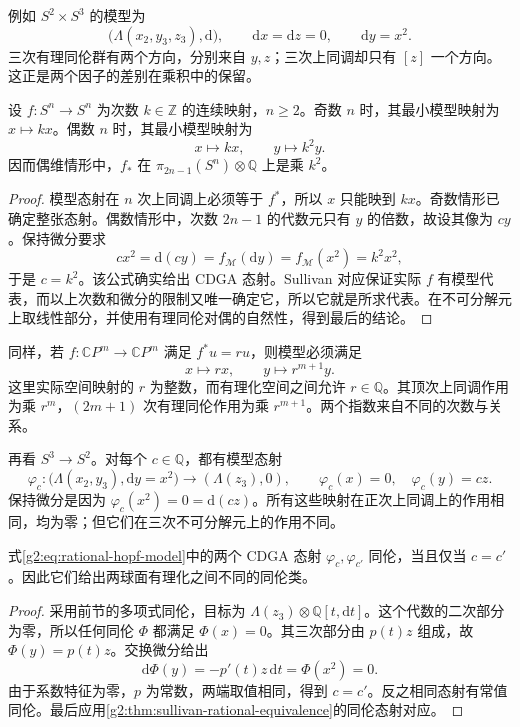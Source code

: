 例如 \(S^2\times S^3\) 的模型为
\[
	\bigl(\Lambda(x_2,y_3,z_3),\mathrm d\bigr),\qquad
	\mathrm dx=\mathrm dz=0,\qquad \mathrm dy=x^2.
\]
三次有理同伦群有两个方向，分别来自 \(y,z\)；三次上同调却只有 \([z]\) 一个方向。这正是两个因子的差别在乘积中的保留。

\begin{proposition}\label{g2:prop:degree-map-minimal-model}
	设 \(f:S^n\to S^n\) 为次数 \(k\in\mathbb Z\) 的连续映射，\(n\geq2\)。奇数 \(n\) 时，其最小模型映射为 \(x\mapsto kx\)。偶数 \(n\) 时，其最小模型映射为
	\[
		x\longmapsto kx,\qquad y\longmapsto k^2y.
	\]
	因而偶维情形中，\(f_*\) 在 \(\pi_{2n-1}(S^n)\otimes\mathbb Q\) 上是乘 \(k^2\)。
\end{proposition}
\begin{proof}
	模型态射在 \(n\) 次上同调上必须等于 \(f^*\)，所以 \(x\) 只能映到 \(kx\)。奇数情形已确定整张态射。偶数情形中，次数 \(2n-1\) 的代数元只有 \(y\) 的倍数，故设其像为 \(cy\)。保持微分要求
	\[
		c x^2=\mathrm d(cy)=f_{\mathcal M}(\mathrm dy)
		=f_{\mathcal M}(x^2)=k^2x^2,
	\]
	于是 \(c=k^2\)。该公式确实给出 CDGA 态射。Sullivan 对应保证实际 \(f\) 有模型代表，而以上次数和微分的限制又唯一确定它，所以它就是所求代表。在不可分解元上取线性部分，并使用有理同伦对偶的自然性，得到最后的结论。
\end{proof}

同样，若 \(f:\mathbb CP^m\to\mathbb CP^m\) 满足 \(f^*u=ru\)，则模型必须满足
\[
	x\longmapsto rx,\qquad y\longmapsto r^{m+1}y.
\]
这里实际空间映射的 \(r\) 为整数，而有理化空间之间允许 \(r\in\mathbb Q\)。其顶次上同调作用为乘 \(r^m\)，\((2m+1)\) 次有理同伦作用为乘 \(r^{m+1}\)。两个指数来自不同的次数与关系。

\ProseParagraphBreak

再看 \(S^3\to S^2\)。对每个 \(c\in\mathbb Q\)，都有模型态射
\begin{equation}\label{g2:eq:rational-hopf-model}
	\varphi_c:\bigl(\Lambda(x_2,y_3),\mathrm dy=x^2\bigr)\longrightarrow(\Lambda(z_3),0),
	\qquad \varphi_c(x)=0,\quad\varphi_c(y)=cz.
\end{equation}
保持微分是因为 \(\varphi_c(x^2)=0=\mathrm d(cz)\)。所有这些映射在正次上同调上的作用相同，均为零；但它们在三次不可分解元上的作用不同。

\begin{proposition}\label{g2:prop:rational-hopf-models-distinct}
	式\eqref{g2:eq:rational-hopf-model}中的两个 CDGA 态射 \(\varphi_c,\varphi_{c'}\) 同伦，当且仅当 \(c=c'\)。因此它们给出两球面有理化之间不同的同伦类。
\end{proposition}
\begin{proof}
	采用前节的多项式同伦，目标为 \(\Lambda(z_3)\otimes\mathbb Q[t,\mathrm dt]\)。这个代数的二次部分为零，所以任何同伦 \(\Phi\) 都满足 \(\Phi(x)=0\)。其三次部分由 \(p(t)z\) 组成，故 \(\Phi(y)=p(t)z\)。交换微分给出
	\[
		\mathrm d\Phi(y)=-p'(t)z\,\mathrm dt=\Phi(x^2)=0.
	\]
	由于系数特征为零，\(p\) 为常数，两端取值相同，得到 \(c=c'\)。反之相同态射有常值同伦。最后应用\cref{g2:thm:sullivan-rational-equivalence}的同伦态射对应。
\end{proof}


